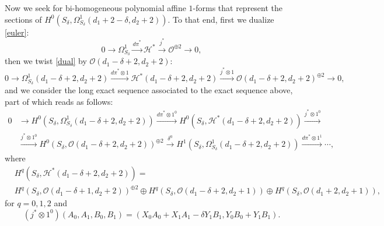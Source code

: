 \documentclass{amsart} %
\theoremstyle{definition}
\newcommand{\cts}{\Theta_{S_{\delta}}}
\newcommand{\cs}{S_{\delta}}
\newcommand{\mcL}{\mathcal{L}}
\newcommand{\mcO}{\mathcal{O}}
\newcommand{\mcH}{\mathcal{H}}
\begin{document}
Now we seek for bi-homogeneous polynomial affine $1$-forms that represent the sections of \linebreak
$ H^0( \cs, \Omega_{\cs}^1( d_1 + 2 - \delta, d_2 + 2) ) $. To that end, first we dualize \eqref{euler}:
\begin{equation}\label{dual}
   0\rightarrow \Omega^1_{\cs} \xrightarrow{{d\pi}^*} {\mcH}^*
      \xrightarrow{j^*} \mcO^{\oplus 2} \rightarrow 0,
\end{equation}
then we twist \eqref{dual} by $\mcO(d_1-\delta+2,d_2+2)$:
\begin{equation*}
0\rightarrow \Omega^1_{\cs}(d_1-\delta+2,d_2+2) \xrightarrow{{d\pi}^*\otimes 1}
    {\mcH}^*(d_1-\delta+2,d_2+2) \xrightarrow{j^*\otimes 1}
  \mcO(d_1-\delta+2,d_2+2)^{\oplus 2} \rightarrow 0,
\end{equation*}
and we consider the long exact sequence associated to the exact sequence above, part of which reads as follows:
\begin{equation}\label{LeCcotan}
\begin{split}
  0 & \rightarrow H^0(\cs, \Omega^1_{\cs}(d_1-\delta+2,d_2+2) )\xrightarrow{{d\pi}^*\otimes 1^0}
      H^0(\cs, {\mcH}^*(d_1-\delta+2,d_2+2) ) \xrightarrow{j^*\otimes 1^0} \\
    & \xrightarrow{j^*\otimes 1^0}  H^0(\cs,\mcO(d_1-\delta+2,d_2+2))^{\oplus 2}
      \xrightarrow{\delta^0} H^1(\cs, \Omega^1_{\cs}(d_1-\delta+2,d_2+2) )\xrightarrow{{d\pi}^*\otimes 1^1} \cdots,
\end{split}
\end{equation}
where
\begin{equation}\label{CohomCotan}
  \begin{split}
 & H^q(\cs, {\mcH}^*(d_1-\delta+2,d_2+2) ) = \\
 &  H^q(\cs, \mcO(d_1-\delta+1,d_2+2) )^{\oplus 2} \oplus H^q(\cs, \mcO(d_1-\delta+2,d_2+1) )\oplus H^q(\cs, \mcO(d_1+2,d_2+1)),
\end{split}
\end{equation}
for $ q = 0,1,2 $ and
$$ (j^*\otimes 1^0)(A_0,A_1,B_0,B_1) = (X_0A_0 +X_1A_1-\delta Y_1B_1, Y_0B_0+Y_1B_1).$$
\end{document}
